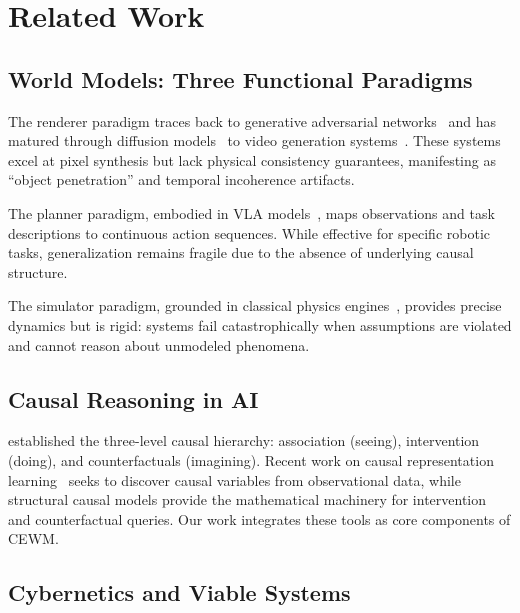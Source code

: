 \documentclass[11pt,a4paper]{article}
\newcommand{\CEWM}{\textsc{CEWM}}
\begin{document}
\section{Related Work}\label{sec:related}

\subsection{World Models: Three Functional Paradigms}

The renderer paradigm traces back to generative adversarial networks~\citep{goodfellow2014gan} and has matured through diffusion models~\citep{ho2020ddpm} to video generation systems~\citep{openai2024sora}. These systems excel at pixel synthesis but lack physical consistency guarantees, manifesting as ``object penetration'' and temporal incoherence artifacts.

The planner paradigm, embodied in VLA models~\citep{brohan2023rt2}, maps observations and task descriptions to continuous action sequences. While effective for specific robotic tasks, generalization remains fragile due to the absence of underlying causal structure.

The simulator paradigm, grounded in classical physics engines~\citep{todorov2012mujoco,takahashi2023jaxmd}, provides precise dynamics but is rigid: systems fail catastrophically when assumptions are violated and cannot reason about unmodeled phenomena.

\subsection{Causal Reasoning in AI}

\citet{pearl2009causality} established the three-level causal hierarchy: association (seeing), intervention (doing), and counterfactuals (imagining). Recent work on causal representation learning~\citep{scholkopf2021causal} seeks to discover causal variables from observational data, while structural causal models provide the mathematical machinery for intervention and counterfactual queries. Our work integrates these tools as core components of \CEWM{}.

\subsection{Cybernetics and Viable Systems}
\end{document}
